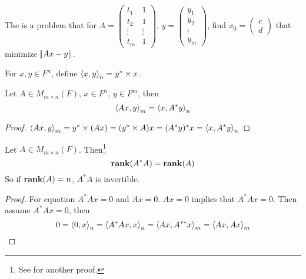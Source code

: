\begin{definition}
    The  is a problem that for $A = \begin{pmatrix}
        t_1 & 1 \\
        t_2 & 1 \\
        \vdots & \vdots \\
        t_m & 1
    \end{pmatrix}$,  $y = \begin{pmatrix}
        y_1\\
        y_2\\
        \vdots\\
        y_m
    \end{pmatrix}$, find $x_0 = \begin{pmatrix}
        c \\
        d
    \end{pmatrix}$ that minimize $\norm{Ax-y}$.
\end{definition}

\begin{definition}
    For $x,y \in F^n$, define $\left\langle \displaystyle x, y \right\rangle_n = y^* \times x$.
\end{definition}


\begin{theorem}
    Let $A \in M_{m \times n} (F)$, $x \in F^n$, $y\in F^m$, then
    \begin{equation}
        \left\langle \displaystyle Ax, y \right\rangle_m = \left\langle \displaystyle x, A^* y \right\rangle_n
    \end{equation}
\end{theorem}
\begin{proof}
    $\left\langle \displaystyle Ax, y \right\rangle_m = y^* \times (Ax) = (y^* \times A) x = (A^* y)^* x = \left\langle \displaystyle x, A^* y \right\rangle_n$
\end{proof}

\begin{theorem}
    Let $A \in M_{m\times n} (F)$. Then\footnote{See  for another proof.}
    \begin{equation}
        \displaystyle \mathbf{rank}( A^*A ) = \displaystyle \mathbf{rank}( A )
    \end{equation}
    So if $\displaystyle \mathbf{rank}( A ) = n$, $A^*A$ is invertible.
\end{theorem}
\begin{proof}
    For equation $A^*Ax = 0$ and $Ax = 0$. $Ax=0$ implies that $A^*Ax =0$. Then assume $A^*Ax = 0$, then
    \begin{equation*}
        0 = \left\langle \displaystyle 0, x \right\rangle_n = \left\langle \displaystyle A^*Ax, x \right\rangle_n = \left\langle \displaystyle Ax, A^{**}x \right\rangle_m = \left\langle \displaystyle Ax, Ax \right\rangle_m
    \end{equation*}
\end{proof}


